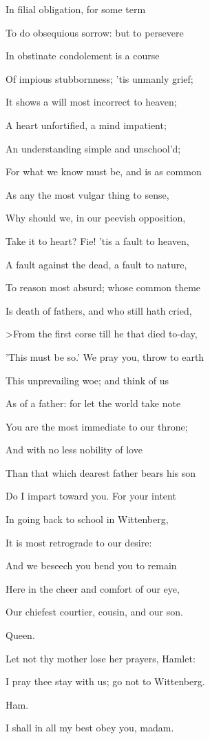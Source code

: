 \documentclass[12pt]{book}
\begin{document}
In filial obligation, for some term

To do obsequious sorrow: but to persevere

In obstinate condolement is a course

Of impious stubbornness; 'tis unmanly grief;

It shows a will most incorrect to heaven;

A heart unfortified, a mind impatient;

An understanding simple and unschool'd;

For what we know must be, and is as common

As any the most vulgar thing to sense,

Why should we, in our peevish opposition,

Take it to heart? Fie! 'tis a fault to heaven,

A fault against the dead, a fault to nature,

To reason most absurd; whose common theme

Is death of fathers, and who still hath cried,

>From the first corse till he that died to-day,

'This must be so.' We pray you, throw to earth

This unprevailing woe; and think of us

As of a father: for let the world take note

You are the most immediate to our throne;

And with no less nobility of love

Than that which dearest father bears his son

Do I impart toward you. For your intent

In going back to school in Wittenberg,

It is most retrograde to our desire:

And we beseech you bend you to remain

Here in the cheer and comfort of our eye,

Our chiefest courtier, cousin, and our son.



Queen.

Let not thy mother lose her prayers, Hamlet:

I pray thee stay with us; go not to Wittenberg.



Ham.

I shall in all my best obey you, madam.
\end{document}
